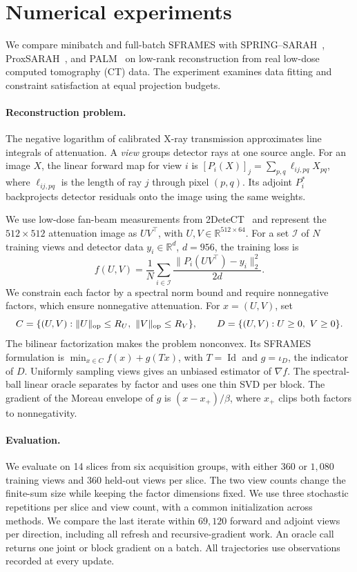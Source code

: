 \section{Numerical experiments}
\label{sec:ct-experiments}

We compare minibatch and full-batch SFRAMES with
SPRING--SARAH~\cite{spring}, ProxSARAH~\cite{proxsarah}, and PALM~\cite{palm}
on low-rank reconstruction from real low-dose computed tomography (CT)
data. The experiment examines data fitting and constraint satisfaction at
equal projection budgets.

\paragraph{Reconstruction problem.}
The negative logarithm of calibrated X-ray transmission approximates line
integrals of attenuation. A \emph{view} groups detector rays at one source
angle. For an image \(X\), the linear forward map for view \(i\) is
\([P_i(X)]_j=\sum_{p,q}\ell_{ij,pq}X_{pq}\), where \(\ell_{ij,pq}\) is
the length of ray \(j\) through pixel \((p,q)\). Its adjoint \(P_i^\ast\)
backprojects detector residuals onto the image using the same weights.

We use low-dose fan-beam measurements from 2DeteCT~\cite{detect} and
represent the \(512\times512\) attenuation image as \(UV^\top\), with
\(U,V\in\mathbb R^{512\times64}\). For a set \(\mathcal I\) of \(N\)
training views and detector data \(y_i\in\mathbb R^d\), \(d=956\), the
training loss is
\begin{equation}
  f(U,V)=\frac1N\sum_{i\in\mathcal I}
          \frac{\|P_i(UV^\top)-y_i\|_2^2}{2d}.
  \label{eq:ct-loss}
\end{equation}
We constrain each factor by a spectral norm bound and require nonnegative
factors, which ensure nonnegative attenuation. For \(x=(U,V)\), set
\[
 C=\{(U,V):\|U\|_{\rm op}\le R_U,\ \|V\|_{\rm op}\le R_V\},
 \qquad D=\{(U,V):U\ge0,\ V\ge0\}.
\]
The bilinear factorization makes the problem nonconvex. Its SFRAMES
formulation is \(\min_{x\in C} f(x)+g(Tx)\), with
\(T=\operatorname{Id}\) and \(g=\iota_D\), the indicator of \(D\).
Uniformly sampling views gives an unbiased estimator of \(\nabla f\).
The spectral-ball linear oracle separates by factor and uses one thin SVD
per block. The gradient of the Moreau envelope of \(g\) is
\((x-x_+)/\beta\), where \(x_+\) clips both factors to nonnegativity.

\paragraph{Evaluation.}
We evaluate on 14 slices from six acquisition groups, with either \(360\)
or \(1{,}080\) training views and \(360\) held-out views per slice.
The two view counts change the finite-sum size while keeping the factor
dimensions fixed. We use three stochastic repetitions per slice and view
count, with a common initialization across methods.
We compare the last iterate within \(69{,}120\) forward and adjoint
views per direction, including all refresh and recursive-gradient work.
An oracle call returns one joint or block gradient on a batch.
All trajectories use observations recorded at every update.

